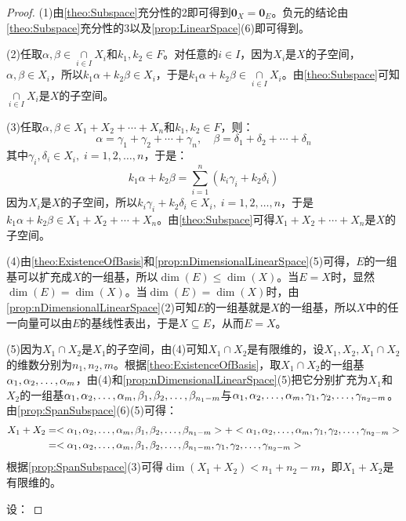 \begin{proof}
	(1)由\cref{theo:Subspace}充分性的2即可得到$\mathbf{0}_X=\mathbf{0}_E$。负元的结论由\cref{theo:Subspace}充分性的3以及\cref{prop:LinearSpace}(6)即可得到。\par
	(2)任取$\alpha,\beta\in\underset{i\in I}{\overset{}{\cap}}X_i$和$k_1,k_2\in F$。对任意的$i\in I$，因为$X_i$是$X$的子空间，$\alpha,\beta\in X_i$，所以$k_1\alpha+k_2\beta\in X_i$，于是$k_1\alpha+k_2\beta\in\underset{i\in I}{\overset{}{\cap}}X_i$。由\cref{theo:Subspace}可知$\underset{i\in I}{\overset{}{\cap}}X_i$是$X$的子空间。\par
	(3)任取$\alpha,\beta\in X_1+X_2+\cdots+X_n$和$k_1,k_2\in F$，则：
	\begin{equation*}
		\alpha=\gamma_1+\gamma_2+\cdots+\gamma_n,\quad
		\beta=\delta_1+\delta_2+\cdots+\delta_n
	\end{equation*}
	其中$\gamma_i,\delta_i\in X_i,\;i=1,2,\dots,n$，于是：
	\begin{equation*}
		k_1\alpha+k_2\beta=\sum_{i=1}^{n}(k_i\gamma_i+k_2\delta_i)
	\end{equation*}
	因为$X_i$是$X$的子空间，所以$k_i\gamma_i+k_2\delta_i\in X_i,\;i=1,2,\dots,n$，于是$k_1\alpha+k_2\beta\in X_1+X_2+\cdots+X_n$。由\cref{theo:Subspace}可得$X_1+X_2+\cdots+X_n$是$X$的子空间。\par
	(4)由\cref{theo:ExistenceOfBasis}和\cref{prop:nDimensionalLinearSpace}(5)可得，$E$的一组基可以扩充成$X$的一组基，所以$\dim(E)\leqslant\dim(X)$。当$E=X$时，显然$\dim(E)=\dim(X)$。当$\dim(E)=\dim(X)$时，由\cref{prop:nDimensionalLinearSpace}(2)可知$E$的一组基就是$X$的一组基，所以$X$中的任一向量可以由$E$的基线性表出，于是$X\subseteq E$，从而$E=X$。\par
	(5)因为$X_1\cap X_2$是$X_1$的子空间，由(4)可知$X_1\cap X_2$是有限维的，设$X_1,X_2,X_1\cap X_2$的维数分别为$n_1,n_2,m$。根据\cref{theo:ExistenceOfBasis}，取$X_1\cap X_2$的一组基$\alpha_1, \alpha_2, \dots, \alpha_{m}$，由(4)和\cref{prop:nDimensionalLinearSpace}(5)把它分别扩充为$X_1$和$X_2$的一组基$\alpha_1, \alpha_2, \dots, \alpha_{m},\beta_1, \beta_2, \dots, \beta_{n_1-m}$与$\alpha_1, \alpha_2, \dots, \alpha_{m},\gamma_1, \gamma_2, \dots, \gamma_{n_2-m}$。由\cref{prop:SpanSubspace}(6)(5)可得：
	\begin{align*}
		X_1+X_2
		&=<\alpha_1, \alpha_2, \dots, \alpha_{m},\beta_1, \beta_2, \dots, \beta_{n_1-m}>+<\alpha_1, \alpha_2, \dots, \alpha_{m},\gamma_1, \gamma_2, \dots, \gamma_{n_2-m}> \\
		&=<\alpha_1, \alpha_2, \dots, \alpha_{m},\beta_1, \beta_2, \dots, \beta_{n_1-m},\gamma_1, \gamma_2, \dots, \gamma_{n_2-m}>
	\end{align*}
	根据\cref{prop:SpanSubspace}(3)可得$\operatorname{dim}(X_1+X_2)<n_1+n_2-m$，即$X_1+X_2$是有限维的。\par
	设：

\end{proof}
